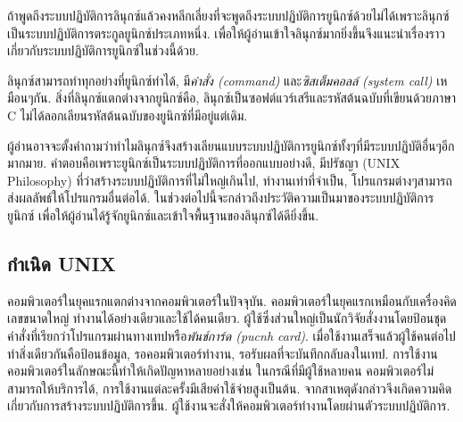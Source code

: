 \begin{thwbr}
{{\begin{figure}[!b]
\end{figure}
ถ้าพูดถึงระบบปฏิบัติการลินุกซ์แล้วคงหลีกเลี่ยงที่จะพูดถึงระบบปฏิบัติการยูนิกซ์ด้วยไม่ได้เพราะลินุกซ์เป็นระบบปฏิบัติการตระกูลยูนิกซ์ประเภทหนึ่ง. เพื่อให้ผู้อ่านเข้าใจลินุกซ์มากยิ่งขึ้นจึงแนะนำเรื่องราวเกี่ยวกับระบบปฏิบัติการยูนิกซ์ในช่วงนี้ด้วย.

ลินุกซ์สามารถทำทุกอย่างที่ยูนิกซ์ทำได้, มี{\em คำสั่ง (command)} และ{\em ซิสเต็มคอลล์ (system call)} เหมือนๆกัน.
สิ่งที่ลินุกซ์แตกต่างจากยูนิกซ์คือ, ลินุกซ์เป็นซอฟต์แวร์เสรีและรหัสต้นฉบับที่เขียนด้วยภาษา C ไม่ได้ลอกเลียนรหัสต้นฉบับของยูนิกซ์ที่มีอยู่แต่เดิม. 

ผู้อ่านอาจจะตั้งคำถามว่าทำไมลินุกซ์จึงสร้างเลียนแบบระบบปฏิบัติการยูนิกซ์ทั้งๆที่มีระบบปฏิบัติอื่นๆอีกมากมาย. คำตอบคือเพราะยูนิกซ์เป็นระบบปฏิบัติการที่ออกแบบอย่างดี, มีปรัชญา (UNIX Philosophy) ที่ว่าสร้างระบบปฏิบัติการที่ไม่ใหญ่เกินไป, ทำงานเท่าที่จำเป็น, โปรแกรมต่างๆสามารถส่งผลลัพธ์ให้โปรแกรมอื่นต่อได้. ในช่วงต่อไปนี้จะกล่าวถึงประวัติความเป็นมาของระบบปฏิบัติการยูนิกซ์ \cite{magicgarden,newfrontier,osbook1} เพื่อให้ผู้อ่านได้รู้จักยูนิกซ์และเข้าใจพื้นฐานของลินุกซ์ได้ดียิ่งขึ้น.

\subsection{กำเนิด  UNIX}
คอมพิวเตอร์ในยุคแรกแตกต่างจากคอมพิวเตอร์ในปัจจุบัน. คอมพิวเตอร์ในยุคแรกเหมือนกับเครื่องคิดเลขขนาดใหญ่ ทำงานได้อย่างเดียวและใช้ได้คนเดียว. ผู้ใช้ซึ่งส่วนใหญ่เป็นนักวิจัยสั่งงานโดยป้อนชุดคำสั่งที่เรียกว่าโปรแกรมผ่านทางเทปหรือ{\em พันช์การ์ด (pucnh card)}. เมื่อใช้งานเสร็จแล้วผู้ใช้คนต่อไปทำสิ่งเดียวกันคือป้อนข้อมูล, รอคอมพิวเตอร์ทำงาน, รอรับผลที่จะบันทึกกลับลงในเทป. การใช้งานคอมพิวเตอร์ในลักษณะนี้ทำให้เกิดปัญหาหลายอย่างเช่น ในกรณีที่มีผู้ใช้หลายคน คอมพิวเตอร์ไม่สามารถให้บริการได้, การใช้งานแต่ละครั้งมีเสียค่าใช้จ่ายสูงเป็นต้น. จากสาเหตุดังกล่าวจึงเกิดความคิดเกี่ยวกับการสร้างระบบปฏิบัติการขึ้น. ผู้ใช้งานจะสั่งให้คอมพิวเตอร์ทำงานโดยผ่านตัวระบบปฏิบัติการ.

}}
\end{thwbr}
